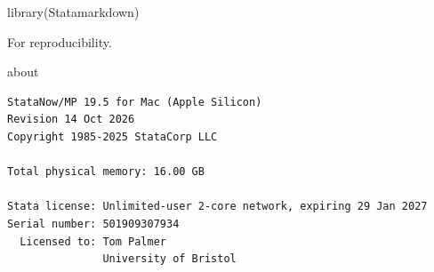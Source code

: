 \documentclass[
  10pt,
  a4paper,
]{book}
\newenvironment{Shaded}{\begin{snugshade}}{\end{snugshade}}
\newcommand{\FunctionTok}[1]{\textcolor[rgb]{0.28,0.35,0.67}{#1}}
\newcommand{\NormalTok}[1]{\textcolor[rgb]{0.00,0.46,0.62}{#1}}
\begin{document}
\begin{Shaded}
\begin{Highlighting}[]
\FunctionTok{library}\NormalTok{(Statamarkdown)}
\end{Highlighting}
\end{Shaded}

For reproducibility.

\begin{Shaded}
\begin{Highlighting}[]
\NormalTok{about}
\end{Highlighting}
\end{Shaded}

\begin{verbatim}
StataNow/MP 19.5 for Mac (Apple Silicon)
Revision 14 Oct 2026
Copyright 1985-2025 StataCorp LLC

Total physical memory: 16.00 GB

Stata license: Unlimited-user 2-core network, expiring 29 Jan 2027
Serial number: 501909307934
  Licensed to: Tom Palmer
               University of Bristol
\end{verbatim}
\end{document}
